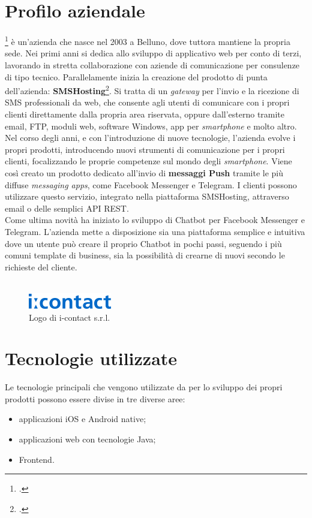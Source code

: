 \section{Profilo aziendale}
\azienda\footcite{icontact} è un'azienda che nasce nel 2003 a Belluno, dove tuttora mantiene la propria sede. Nei primi anni si dedica allo sviluppo di applicativo web per conto di terzi, lavorando in stretta collaborazione con aziende di comunicazione per consulenze di tipo tecnico. Parallelamente inizia la creazione del prodotto di punta dell'azienda: \textbf{SMSHosting}\footcite{smshosting}. Si tratta di un \emph{gateway} per l'invio e la ricezione di SMS professionali da web, che consente agli utenti di comunicare con i propri clienti direttamente dalla propria area riservata, oppure dall'esterno tramite email, \gls{FTP}, moduli web, software Windows, app per \emph{smartphone} e molto altro.  \\
Nel corso degli anni, e con l'introduzione di nuove tecnologie, l'azienda evolve i propri prodotti, introducendo nuovi strumenti di comunicazione per i propri clienti, focalizzando le proprie competenze sul mondo degli \emph{smartphone}.
Viene così creato un prodotto dedicato all'invio di \textbf{messaggi \gls{Push}} tramite le più diffuse \emph{messaging apps}, come Facebook Messenger e Telegram. I clienti possono utilizzare questo servizio, integrato nella piattaforma SMSHosting, attraverso email o delle semplici \gls{API} REST.\\
Come ultima novità \azienda{} ha iniziato lo sviluppo di \gls{Chatbot} per Facebook Messenger e Telegram. L'azienda mette a disposizione sia una piattaforma semplice e intuitiva dove un utente può creare il proprio \gls{Chatbot} in pochi passi, seguendo i più comuni template di business, sia la possibilità di crearne di nuovi secondo le richieste del cliente.
\\ \\
\begin{figure}[h]
	\centering
	\includegraphics[scale=0.7]{../Immagini/logo-icontact.png}
	\caption{Logo di i-contact s.r.l.}
\end{figure}

\section{Tecnologie utilizzate}
Le tecnologie principali che vengono utilizzate da \azienda{} per lo sviluppo dei propri prodotti possono essere divise in tre diverse aree:
\begin{itemize}
	\item applicazioni iOS e Android native;
	\item applicazioni web con tecnologie Java;
	\item \gls{Frontend}.
\end{itemize} 

